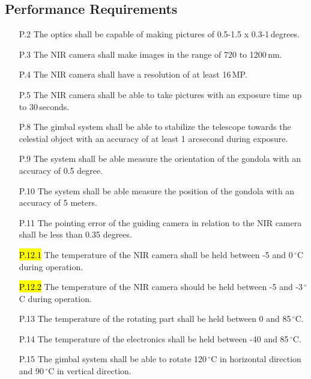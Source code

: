 \subsection{Performance Requirements}

\begin{enumerate}[topsep=0pt,itemsep=-1ex,partopsep=1ex,parsep=1ex]
    \item[P.2] The optics shall be capable of making pictures of 0.5-1.5 x 0.3-1\,degrees.
    \item[P.3] The NIR camera shall make images in the range of 720 to 1200\,nm.
    \item[P.4] The NIR camera shall have a resolution of at least 16\,MP.
    \item[P.5] The NIR camera shall be able to take pictures with an exposure time up to 30\,seconds.
    \item[P.8] The gimbal system shall be able to stabilize the telescope towards the celestial object with an accuracy of at least 1 arcsecond during exposure.
    \item[P.9] The system shall be able measure the orientation of the gondola with an accuracy of 0.5 degree.
	\item[P.10] The system shall be able measure the position of the gondola with an accuracy of 5 meters.
	\item[P.11] The pointing error of the guiding camera in relation to the NIR camera shall be less than 0.35 degrees.
	\item[\hl{P.12.1}]The temperature of the NIR camera shall be held between -5 and 0\,$^\circ$C during operation.
	\item[\hl{P.12.2}] The temperature of the NIR camera should be held between -5 and -3\,$^\circ$C during operation.
	\item[P.13] The temperature of the rotating part shall be held between 0 and 85\,$^\circ$C.
	\item[P.14] The temperature of the electronics shall be held between -40 and 85\,$^\circ$C.
	\item[P.15] The gimbal system shall be able to rotate 120\,$^\circ$C in horizontal direction and 90\,$^\circ$C in vertical direction.
\end{enumerate}
